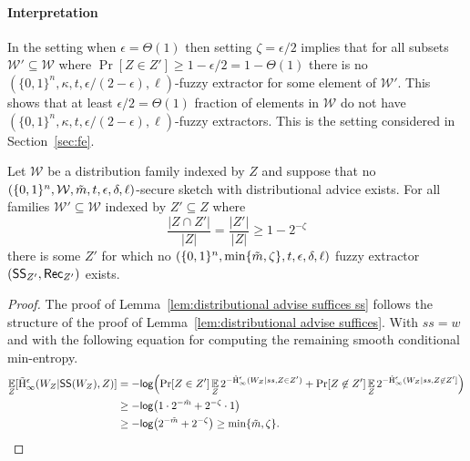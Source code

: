 \paragraph{Interpretation} 
%
In the setting when $\epsilon = \Theta(1)$ then setting $\zeta = \epsilon/2$ implies that for all subsets $\mathcal{W}' \subseteq \mathcal{W}$ where $\Pr[Z\in Z']\ge 1-\epsilon/2 = 1-\Theta(1)$ there is no $(\{0,1\}^n,\kappa, t, \epsilon/(2-\epsilon), \ell)$-fuzzy extractor for some element of $\mathcal{W}'$.  This shows that at least $\epsilon/2=\Theta(1)$ fraction of elements in $\mathcal{W}$ do not have $(\{0,1\}^n,\kappa, t, \epsilon/(2-\epsilon), \ell)$-fuzzy extractors. This is the setting considered in Section~\ref{sec:fe}.


\begin{lemma}
Let $\mathcal{W}$ be a distribution family indexed by $Z$ and suppose that no $(\{0, 1\}^n, \mathcal{W}, \tilde{m}, t, \epsilon, \delta, \ell)$-secure sketch with distributional advice exists.  For all families $\mathcal{W}'\subseteq \mathcal{W}$ indexed by $Z'\subseteq Z$ where\[\frac{|Z\cap Z'|}{|Z|} = \frac{|Z'|}{|Z|}\ge 1-2^{-\zeta}\]
there is some $Z'$ for which no  $(\{0, 1\}^n, \min\{\tilde{m}, \zeta\}, t, \epsilon, \delta, \ell)$ fuzzy extractor $({\mathsf{SS}}_{Z'}, {\mathsf{Rec}}_{Z'})$  exists.
\label{lem:distributional advise suffices ss}
\end{lemma}

\begin{proof}
The proof of Lemma~\ref{lem:distributional advise suffices ss} follows the structure of the proof of Lemma~\ref{lem:distributional advise suffices}.  With $ss=w$ and with the following equation for computing the remaining smooth conditional min-entropy.
\begin{align*}
\operatorname*{\mathbb{E}}_{Z} [\tilde{\mathrm{H}}_\infty^\epsilon(W_Z| {\mathsf{SS}}(W_Z), Z)] &= -\mathsf{log}\!\left(\Pr[Z\in Z']\operatorname*{\mathbb{E}}_{Z} 2^{-\tilde{\mathrm{H}}_\infty^\epsilon(W_Z| ss, Z\in Z')}+ \Pr[Z\not\in Z']\operatorname*{\mathbb{E}}_{Z} 2^{-\tilde{\mathrm{H}}_\infty^\epsilon(W_Z| ss, Z\not\in Z'] }\right)\\
&\ge -\mathsf{log}\!\left(1 \cdot 2^{-\tilde{m}}+ 2^{-\zeta}\cdot 1\right)\\
&\ge -\mathsf{log}\!\left(2^{-\tilde{m}}+2^{-\zeta}\right)  \ge \min\{\tilde{m},\zeta\}.
\end{align*}
\end{proof}

